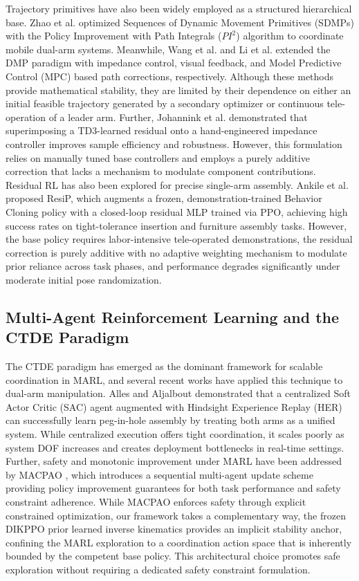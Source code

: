 \documentclass[lettersize,journal]{IEEEtran}
\begin{document}
Trajectory primitives have also been widely employed as a structured hierarchical base. Zhao et al. \cite{related-40} optimized Sequences of Dynamic Movement Primitives (SDMPs) with the Policy Improvement with Path Integrals ($PI^{2}$) algorithm to coordinate mobile dual-arm systems. Meanwhile, Wang et al. \cite{related-41} and Li et al. \cite{related-42} extended the DMP paradigm with impedance control, visual feedback, and Model Predictive Control (MPC) based path corrections, respectively. Although these methods provide mathematical stability, they are limited by their dependence on either an initial feasible trajectory generated by a secondary optimizer or continuous tele-operation of a leader arm. Further, Johannink et al. \cite{residual} demonstrated that superimposing a TD3-learned residual onto a hand-engineered impedance controller improves sample efficiency and robustness. However, this formulation relies on manually tuned base controllers and employs a purely additive correction that lacks a mechanism to modulate component contributions. Residual RL has also been explored for precise single-arm assembly. Ankile et al. \cite{ResiP} proposed ResiP, which augments a frozen, demonstration-trained Behavior Cloning policy with a closed-loop residual MLP trained via PPO, achieving high success rates on tight-tolerance insertion and furniture assembly tasks. However, the base policy requires labor-intensive tele-operated demonstrations, the residual correction is purely additive with no adaptive weighting mechanism to modulate prior reliance across task phases, and performance degrades significantly under moderate initial pose randomization. 

\subsection{Multi-Agent Reinforcement Learning and the CTDE Paradigm}
The CTDE paradigm has emerged as the dominant framework for scalable coordination in MARL, and several recent works have applied this technique to dual-arm manipulation. Alles and Aljalbout \cite{related-43} demonstrated that a centralized Soft Actor Critic (SAC) agent augmented with Hindsight Experience Replay (HER) can successfully learn peg-in-hole assembly by treating both arms as a unified system. While centralized execution offers tight coordination, it scales poorly as system DOF increases and creates deployment bottlenecks in real-time settings. Further, safety and monotonic improvement under MARL have been addressed by MACPAO \cite{related-44}, which introduces a sequential multi-agent update scheme providing policy improvement guarantees for both task performance and safety constraint adherence. While MACPAO enforces safety through explicit constrained optimization, our framework takes a complementary way, the frozen DIKPPO prior learned inverse kinematics provides an implicit stability anchor, confining the MARL exploration to a coordination action space that is inherently bounded by the competent base policy. This architectural choice promotes safe exploration without requiring a dedicated safety constraint formulation.
\end{document}
